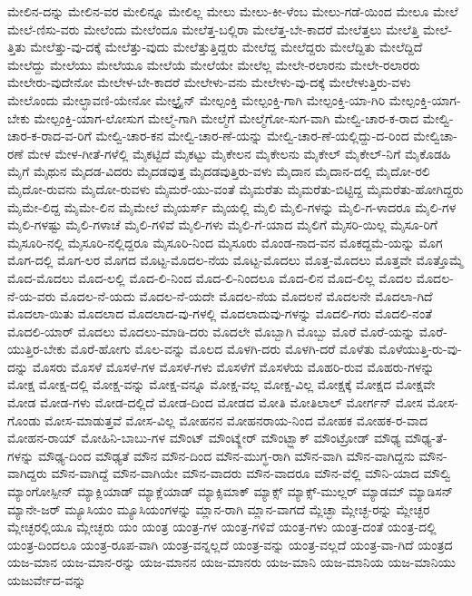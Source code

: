 {ಮೇಲಿನ-ದನ್ನು
ಮೇಲಿನ-ವರ
ಮೇಲಿನ್ನೂ
ಮೇಲಿಲ್ಲ
ಮೇಲು
ಮೇಲು-ಕೀ-ಳೆಂಬ
ಮೇಲು-ಗಡೆ-ಯಿಂದ
ಮೇಲೂ
ಮೇಲೆ
ಮೇಲೆ-ಣಿಸು-ವರು
ಮೇಲೆಂದು
ಮೇಲೆಂದೂ
ಮೇಲೆತ್ತ-ಬಲ್ಲಿರಾ
ಮೇಲೆತ್ತ-ಬೇ-ಕಾದರೆ
ಮೇಲೆತ್ತಲು
ಮೇಲೆತ್ತಿ
ಮೇಲೆ-ತ್ತಿತು
ಮೇಲೆತ್ತು-ವು-ದಕ್ಕೆ
ಮೇಲೆತ್ತು-ವುದು
ಮೇಲೆತ್ತುತ್ತಿದ್ದರು
ಮೇಲೆದ್ದ
ಮೇಲೆದ್ದರು
ಮೇಲೆದ್ದಿತು
ಮೇಲೆದ್ದಿದೆ
ಮೇಲೆದ್ದು
ಮೇಲೆಯು
ಮೇಲೆಯೂ
ಮೇಲೆಯೆ
ಮೇಲೆಯೇ
ಮೇಲೆಲ್ಲ
ಮೇಲೇ-ರಲಾರನು
ಮೇಲೇ-ರಲಾರರು
ಮೇಲೇರು-ವುದೇನೋ
ಮೇಲೇಳ-ಬೇ-ಕಾದರೆ
ಮೇಲೇಳು-ವನು
ಮೇಲೇಳು-ವು-ದಕ್ಕೆ
ಮೇಲೇಳುತ್ತಿರು-ವಳು
ಮೇಲೊಂದು
ಮೇಲ್ಛಾವಣಿ-ಯೇನೋ
ಮೇಲ್ಟ್ರೈನ್
ಮೇಲ್ಪಂಕ್ತಿ
ಮೇಲ್ಪಂಕ್ತಿ-ಗಾಗಿ
ಮೇಲ್ಪಂಕ್ತಿ-ಯಾ-ಗಿರಿ
ಮೇಲ್ಪಂಕ್ತಿ-ಯಾಗ-ಬೇಕು
ಮೇಲ್ಪಂಕ್ತಿ-ಯಾಗ-ಲೋಸುಗ
ಮೇಲ್ಮೆ-ಗಾಗಿ
ಮೇಲ್ಮೆಗೆ
ಮೇಲ್ಮೆಗೋ-ಸುಗ-ವಾಗಿ
ಮೇಲ್ವಿ-ಚಾರ-ಕ-ರಾದ
ಮೇಲ್ವಿ-ಚಾರ-ಕ-ರಾದ-ವ-ರಿಗೆ
ಮೇಲ್ವಿ-ಚಾರ-ಕನ
ಮೇಲ್ವಿ-ಚಾರ-ಣೆ-ಯನ್ನು
ಮೇಲ್ವಿ-ಚಾರ-ಣೆ-ಯಲ್ಲಿದ್ದು-ದ-ರಿಂದ
ಮೇಲ್ವಿಚಾ-ರಣೆ
ಮೇಳ
ಮೇಳ-ಗೀತೆ-ಗಳೆಲ್ಲಿ
ಮೈಕಟ್ಟಿದೆ
ಮೈಕಟ್ಟು
ಮೈಕೇಲನ
ಮೈಕೇಲನು
ಮೈಕೇಲ್
ಮೈಕೇಲ್-ನಿಗೆ
ಮೈಕೊಡಹಿ
ಮೈಗೆ
ಮೈಥುನ
ಮೈದಡ-ವಿದರು
ಮೈದಡವುತ್ತ
ಮೈದಡವುತ್ತಿರು-ವಳು
ಮೈದಾನ
ಮೈದಾನ-ದಲ್ಲಿ
ಮೈದೋ-ರಲಿ
ಮೈದೋ-ರುವನು
ಮೈದೋ-ರುವಳು
ಮೈಮರೆ-ಯು-ವಂತೆ
ಮೈಮರೆತು
ಮೈಮರೆತು-ಬಿಟ್ಟಿದ್ದ
ಮೈಮರೆತು-ಹೋಗಿದ್ದರು
ಮೈಮೇ-ಲಿದ್ದ
ಮೈಮೇ-ಲಿನ
ಮೈಮೇಲೆ
ಮೈಯರ್ಸ್
ಮೈಯಲ್ಲಿ
ಮೈಲಿ
ಮೈಲಿ-ಗಳನ್ನು
ಮೈಲಿ-ಗ-ಳಾದರೂ
ಮೈಲಿ-ಗಳ
ಮೈಲಿ-ಗಳಷ್ಟು
ಮೈಲಿ-ಗಳಾಚೆ
ಮೈಲಿ-ಗಳಿವೆ
ಮೈಲಿ-ಗಳು
ಮೈಲಿ-ಗೆ-ಯಾದ
ಮೈಲಿಗೆ
ಮೈಸರಿ-ಯಿಲ್ಲ
ಮೈಸೂ-ರಿಗೆ
ಮೈಸೂರಿ-ನಲ್ಲಿ
ಮೈಸೂರಿ-ನಲ್ಲಿದ್ದರೂ
ಮೈಸೂರಿ-ನಿಂದ
ಮೈಸೂರು
ಮೊಂಡ-ನಾದ-ವನ
ಮೊಕದ್ದಮೆ-ಯನ್ನು
ಮೊಗ
ಮೊಗ-ದಲ್ಲಿ
ಮೊಗ-ಲರ
ಮೊಗದ
ಮೊಟ್ಟ-ಮೊದಲ-ನೆಯ
ಮೊಟ್ಟ-ಮೊದಲು
ಮೊತ್ತ-ಮೊದಲು
ಮೊತ್ತವೇ
ಮೊತ್ತೊಮ್ಮೆ
ಮೊದ-ಮೊದಲು
ಮೊದ-ಲಲ್ಲಿ
ಮೊದ-ಲಿ-ನಿಂದ
ಮೊದ-ಲಿ-ನಿಂದಲೂ
ಮೊದ-ಲಿನ
ಮೊದ-ಲಿಲ್ಲ
ಮೊದಲ
ಮೊದಲ-ನೆ-ಯ-ವರು
ಮೊದಲ-ನೆ-ಯದು
ಮೊದಲ-ನೆ-ಯದೇ
ಮೊದಲ-ನೆಯ
ಮೊದಲನೆ
ಮೊದಲನೇ
ಮೊದಲಾ-ಗಿದೆ
ಮೊದಲಾ-ಯಿತು
ಮೊದಲಾದ
ಮೊದಲಾದ-ವು-ಗಳಲ್ಲಿ
ಮೊದಲಾದುವು-ಗಳನ್ನು
ಮೊದಲಿ-ಗರು
ಮೊದಲಿ-ನಂತೆ
ಮೊದಲಿ-ಯಾರ್
ಮೊದಲು
ಮೊದಲು-ಮಾಡಿ-ದರು
ಮೊದಲೇ
ಮೊಬ್ಬಾಗಿ
ಮೊಬ್ಬು
ಮೊರೆ
ಮೊರೆ-ಯನ್ನು
ಮೊರೆ-ಯುತ್ತಿರ-ಬೇಕು
ಮೊರೆ-ಹೋಗು
ಮೊಲ-ವನ್ನು
ಮೊಲದ
ಮೊಳಗಿ-ದರು
ಮೊಳಗಿ-ದರೆ
ಮೊಳೆತು
ಮೊಳೆಯುತ್ತಿ-ರು-ವು-ದನ್ನು
ಮೊಸರು
ಮೊಸಳೆ
ಮೊಸಳೆ-ಗಳ
ಮೊಸಳೆ-ಗಳು
ಮೊಸಳೆಗೆ
ಮೊಸಳೆಯ
ಮೊಹರಿ-ರುವ
ಮೊಹರು-ಗಳನ್ನು
ಮೋಕ್ಷ
ಮೋಕ್ಷ-ದಲ್ಲಿ
ಮೋಕ್ಷ-ವನ್ನು
ಮೋಕ್ಷ-ವನ್ನೂ
ಮೋಕ್ಷ-ವಲ್ಲ
ಮೋಕ್ಷ-ವಿಲ್ಲ
ಮೋಕ್ಷಕ್ಕೆ
ಮೋಕ್ಷದ
ಮೋಕ್ಷವೇ
ಮೋಡ
ಮೋಡ-ಗಳು
ಮೋಡ-ದಲ್ಲಿದೆ
ಮೋಡ-ದಿಂದ
ಮೋಡದ
ಮೋತಿ
ಮೋತಿಲಾಲ್
ಮೋರ್ಗನ್
ಮೋಸ
ಮೋಸ-ಗೊಂಡು
ಮೋಸ-ಮಾಡುತ್ತವೆ
ಮೋಸ-ವಿಲ್ಲ
ಮೋಹನನ
ಮೋಹನರಾಯ-ನಿಂದ
ಮೋಹಕ
ಮೋಹಕ-ರ-ವಾದ
ಮೋಹನ-ರಾಯ್
ಮೋಹಿನಿ-ಬಾಬು-ಗಳ
ಮೌಂಟ್
ಮೌಂಟ್ಕ್ಲೇರ್
ಮೌಂಟ್ಬ್ಲಾಕ್
ಮೌಂಟ್ರೋಡ್
ಮೌಢ್ಯ
ಮೌಢ್ಯ-ತೆ-ಗಳನ್ನು
ಮೌಢ್ಯ-ದಿಂದ
ಮೌಢ್ಯತೆ
ಮೌನ
ಮೌನ-ದಿಂದ
ಮೌನ-ಮುಗ್ಧ-ರಾಗಿ
ಮೌನ-ವಾಗಿ
ಮೌನ-ವಾಗಿದ್ದನು
ಮೌನ-ವಾಗಿದ್ದರು
ಮೌನ-ವಾಗಿದ್ದೆ
ಮೌನ-ವಾಗಿಯೇ
ಮೌನ-ವಾದರು
ಮೌನ-ವಾದರೂ
ಮೌನ-ವೆಲ್ಲಿ
ಮೌನಿ-ಯಾದ
ಮೌಲ್ವಿ
ಮ್ಯಾಂಗೋಸ್ಪೀನ್
ಮ್ಯಾಕ್ಲಿಯಾಡ್
ಮ್ಯಾಕ್ಲೆಯಾಡ್
ಮ್ಯಾಕ್ಸಿಮಾಕ್
ಮ್ಯಾಕ್ಸ್
ಮ್ಯಾಕ್ಸ್-ಮುಲ್ಲರ್
ಮ್ಯಾಡಮ್
ಮ್ಯಾಡಿಸನ್
ಮ್ಯಾನೇ-ಜರ್
ಮ್ಯೂಸಿಯಂ
ಮ್ಯೂಸಿಯಂಗಳನ್ನು
ಮ್ಲಾನ-ರಾಗಿ
ಮ್ಲಾನ-ವಾಗದೆ
ಮ್ಲೆಚ್ಛಾ
ಮ್ಲೇಚ್ಛ-ರನ್ನು
ಮ್ಲೇಚ್ಛರ
ಮ್ಲೇಚ್ಛರಲ್ಲಿಯೂ
ಮ್ಲೇಚ್ಛರು
ಯಂ
ಯಂತ್ರ
ಯಂತ್ರ-ಗಳ
ಯಂತ್ರ-ಗಳಿವೆ
ಯಂತ್ರ-ಗಳು
ಯಂತ್ರ-ದಂತೆ
ಯಂತ್ರ-ದಲ್ಲಿ
ಯಂತ್ರ-ದಿಂದಲೂ
ಯಂತ್ರ-ರೂಪ-ವಾಗಿ
ಯಂತ್ರ-ವನ್ನಲ್ಲದೆ
ಯಂತ್ರ-ವನ್ನು
ಯಂತ್ರ-ವಲ್ಲದೆ
ಯಂತ್ರ-ವಾ-ಗಿದೆ
ಯಂತ್ರದ
ಯಜ-ಮಾನ
ಯಜ-ಮಾನ-ರನ್ನು
ಯಜ-ಮಾನನ
ಯಜ-ಮಾನರು
ಯಜ-ಮಾನಿ
ಯಜ-ಮಾನಿಯ
ಯಜ-ಮಾನಿಯು
ಯಜುರ್ವೇದ-ವನ್ನು
}
